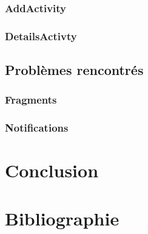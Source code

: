 \documentclass[12pt,a4paper]{report}
\begin{document}
\subsection{AddActivity}
\subsection{DetailsActivty}
\section{Problèmes rencontrés}
\subsection{Fragments}
\subsection{Notifications}

\newpage
\chapter{Conclusion}
\newpage
\chapter{Bibliographie}
\end{document}

